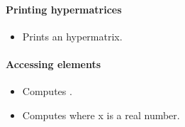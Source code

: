 \paragraph{Printing hypermatrices}

\begin{itemize}
\item {}
  \sshortdescribe Prints an hypermatrix.
\end{itemize}

\paragraph{Accessing elements}

\begin{itemize}
\item {}
  \sshortdescribe Computes .
  
\item {}
  \sshortdescribe Computes  where x is a real number.
\end{itemize}





